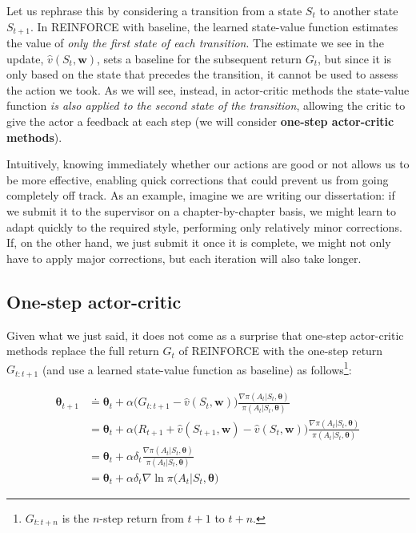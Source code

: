 Let us rephrase this by considering a transition from a state $S_t$ to another state $S_{t+1}$. In REINFORCE with baseline, the learned state-value function estimates the value of \textit{only the first state of each transition}. The estimate we see in the update, $\hat{v}(S_t,\boldsymbol{w})$, sets a baseline for the subsequent return $G_t$, but since it is only based on the state that precedes the transition, it cannot be used to assess the action we took. As we will see, instead, in actor-critic methods the state-value function \textit{is also applied to the second state of the transition}, allowing the critic to give the actor a feedback at each step (we will consider \textbf{one-step actor-critic methods}).

Intuitively, knowing immediately whether our actions are good or not allows us to be more effective, enabling quick corrections that could prevent us from going completely off track. As an example, imagine we are writing our dissertation: if we submit it to the supervisor on a chapter-by-chapter basis, we might learn to adapt quickly to the required style, performing only relatively minor corrections. If, on the other hand, we just submit it once it is complete, we might not only have to apply major corrections, but each iteration will also take longer.

\subsection{One-step actor-critic}
Given what we just said, it does not come as a surprise that one-step actor-critic methods replace the full return $G_t$ of REINFORCE with the one-step return $G_{t:t+1}$ (and use a learned state-value function as baseline) as follows\footnote{$G_{t:t+n}$ is the $n$-step return from $t+1$ to $t+n$.}:

\begin{equation}
    \begin{split}
        \boldsymbol{\theta}_{t+1} &\doteq \boldsymbol{\theta}_t + \alpha \big(G_{t:t+1} - \hat{v}(S_t,\boldsymbol{w}) \big) \frac{\nabla \pi (A_t \vert S_t, \boldsymbol{\theta})}{\pi (A_t \vert S_t, \boldsymbol{\theta})} \\
        &= \boldsymbol{\theta}_t + \alpha \big(R_{t+1} + \hat{v}(S_{t+1},\boldsymbol{w}) - \hat{v}(S_t,\boldsymbol{w}) \big) \frac{\nabla \pi (A_t \vert S_t, \boldsymbol{\theta})}{\pi (A_t \vert S_t, \boldsymbol{\theta})} \\
        &= \boldsymbol{\theta}_t + \alpha \delta_t \frac{\nabla \pi (A_t \vert S_t, \boldsymbol{\theta})}{\pi (A_t \vert S_t, \boldsymbol{\theta})} \\
        &= \boldsymbol{\theta}_t + \alpha \delta_t \nabla \ln{\pi (A_t \vert S_t, \boldsymbol{\theta}})
    \end{split}
    \label{eq:ch8-onestepactorcriticupdaterule}
\end{equation}

